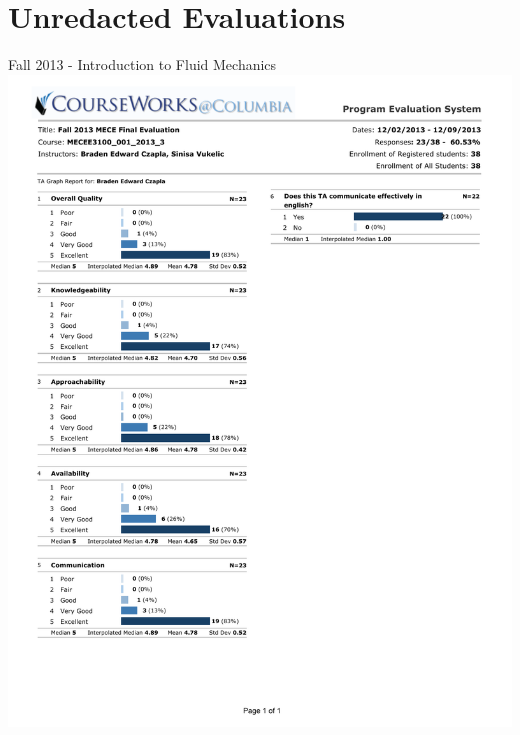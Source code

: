 \section{Unredacted Evaluations}

\centering
Fall 2013 - Introduction to Fluid Mechanics
\includegraphics*[width=\textwidth, page=1, trim={0.25in 1in 0.25in 0.25in}]{./Teaching_Evaluations/BradenCzapla_TAEvaluation_Fall2013.pdf}

